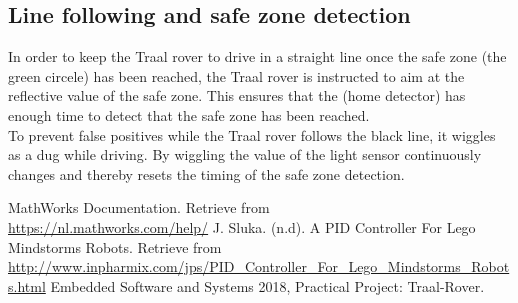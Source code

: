 \documentclass[a4paper,12pt]{article}
\begin{document}
\subsection{Line following and safe zone detection}
In order to keep the Traal rover to drive in a straight line once the safe zone (the green circele) has been reached, the Traal rover is instructed to aim at the reflective value of the safe zone. This ensures that the (home detector) has enough time to detect that the safe zone has been reached.\\
To prevent false positives while the Traal rover follows the black line, it wiggles as a dug while driving. By wiggling the value of the light sensor continuously changes and thereby resets the timing of the safe zone detection.


\begin{thebibliography}{9}
 MathWorks Documentation. Retrieve from\\
\url{https://nl.mathworks.com/help/}
J. Sluka. (n.d). A PID Controller For Lego Mindstorms Robots. Retrieve from\\
\url{http://www.inpharmix.com/jps/PID_Controller_For_Lego_Mindstorms_Robots.html}
 Embedded Software and Systems 2018, Practical Project: Traal-Rover.
\end{thebibliography}
\end{document}
